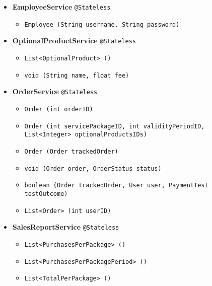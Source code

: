 \begin{itemize}
    \item \textbf{EmployeeService} \texttt{@Stateless}
        \begin{itemize}[label = {$\circ$}]
            \item \texttt{Employee (String username, String password)}
        \end{itemize}
    \item \textbf{OptionalProductService} \texttt{@Stateless}
        \begin{itemize}[label = {$\circ$}]
            \item \texttt{List<OptionalProduct> ()}
            \item \texttt{void (String name, float fee)}
        \end{itemize}
    \item \textbf{OrderService} \texttt{@Stateless}
        \begin{itemize}[label = {$\circ$}, leftmargin = \leftmargin + 1em, itemindent = -1em]
            \item \texttt{Order (int orderID)}
            \item \texttt{Order (int servicePackageID, int validityPeriodID, \\ 
                List<Integer> optionalProductsIDs)}
            \item \texttt{Order (Order trackedOrder)}
            \item \texttt{void (Order order, OrderStatus status)}
            \item \texttt{boolean (Order trackedOrder, User user, PaymentTest testOutcome)}
            \item \texttt{List<Order> (int userID)}
        \end{itemize}
    \item \textbf{SalesReportService} \texttt{@Stateless}
        \begin{itemize}[label = {$\circ$}]
            \item \texttt{List<PurchasesPerPackage> ()}
            \item \texttt{List<PurchasesPerPackagePeriod> ()}
            \item \texttt{List<TotalPerPackage> ()}

\end{itemize}
\end{itemize}
